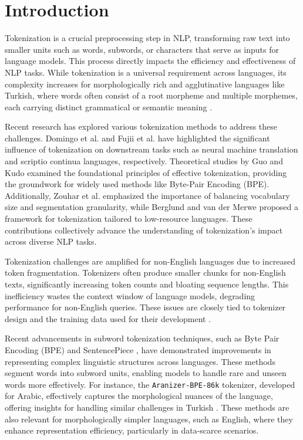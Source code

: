 \section{Introduction}

Tokenization is a crucial preprocessing step in NLP, transforming raw text into smaller units such as words, subwords, or characters that serve as inputs for language models. This process directly impacts the efficiency and effectiveness of NLP tasks. While tokenization is a universal requirement across languages, its complexity increases for morphologically rich and agglutinative languages like Turkish, where words often consist of a root morpheme and multiple morphemes, each carrying distinct grammatical or semantic meaning \cite{schmidt_tokenization_2024}.

Recent research has explored various tokenization methods to address these challenges. Domingo et al. \cite{domingo2019how} and Fujii et al. \cite{fujii2023how} have highlighted the significant influence of tokenization on downstream tasks such as neural machine translation and scriptio continua languages, respectively. Theoretical studies by Guo \cite{guo1997critical} and Kudo \cite{kudo_sentencepiece_2018} examined the foundational principles of effective tokenization, providing the groundwork for widely used methods like Byte-Pair Encoding (BPE). Additionally, Zouhar et al. \cite{zouhar2023formal} emphasized the importance of balancing vocabulary size and segmentation granularity, while Berglund and van der Merwe \cite{berglund2023theoretical} proposed a framework for tokenization tailored to low-resource languages. These contributions collectively advance the understanding of tokenization's impact across diverse NLP tasks.

Tokenization challenges are amplified for non-English languages due to increased token fragmentation. Tokenizers often produce smaller chunks for non-English texts, significantly increasing token counts and bloating sequence lengths. This inefficiency wastes the context window of language models, degrading performance for non-English queries. These issues are closely tied to tokenizer design and the training data used for their development \cite{samiullah_technical_nodate}.

Recent advancements in subword tokenization techniques, such as Byte Pair Encoding (BPE) \cite{gage_new_1994} and SentencePiece \cite{kudo_sentencepiece_2018}, have demonstrated improvements in representing complex linguistic structures across languages. These methods segment words into subword units, enabling models to handle rare and unseen words more effectively. For instance, the \texttt{Aranizer-BPE-86k} tokenizer, developed for Arabic, effectively captures the morphological nuances of the language, offering insights for handling similar challenges in Turkish \cite{koubaa_githubcomriotu-labaranizer_2024}. These methods are also relevant for morphologically simpler languages, such as English, where they enhance representation efficiency, particularly in data-scarce scenarios.

